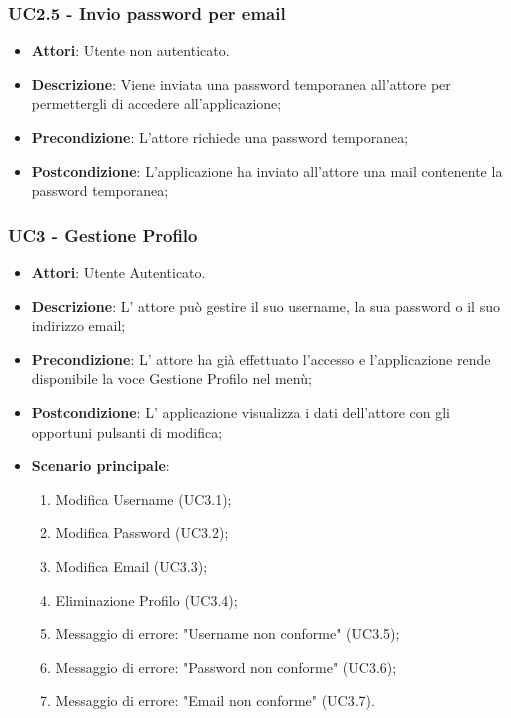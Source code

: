 \subsubsection{UC2.5 - Invio password per email} 
\label{sssec:UC2.5} 
\begin{itemize} 
\item \textbf{Attori}: Utente non autenticato.
\item \textbf{Descrizione}: Viene inviata una password temporanea all'attore per permettergli di accedere all'applicazione;
\item \textbf{Precondizione}: L'attore richiede una password temporanea;
\item \textbf{Postcondizione}: L'applicazione ha inviato all'attore una mail contenente la password temporanea;
\end{itemize} 
\subsubsection{UC3 - Gestione Profilo} 
\label{sssec:UC3} 
\begin{itemize} 
\item \textbf{Attori}: Utente Autenticato.
\item \textbf{Descrizione}: L' attore può gestire il suo username, la sua password o il suo indirizzo email;
\item \textbf{Precondizione}: L' attore ha già effettuato l'accesso e l'applicazione rende disponibile la voce Gestione Profilo nel menù;
\item \textbf{Postcondizione}: L' applicazione visualizza i dati dell'attore con gli opportuni pulsanti di modifica;
\item \textbf{Scenario principale}: \begin{enumerate}\item Modifica Username (UC3.1);\item Modifica Password (UC3.2);\item Modifica Email (UC3.3);\item Eliminazione Profilo (UC3.4);\item Messaggio di errore: "Username non conforme" (UC3.5);\item Messaggio di errore: "Password non conforme" (UC3.6);\item Messaggio di errore: "Email non conforme" (UC3.7). 
 \end{enumerate}
\end{itemize} 
